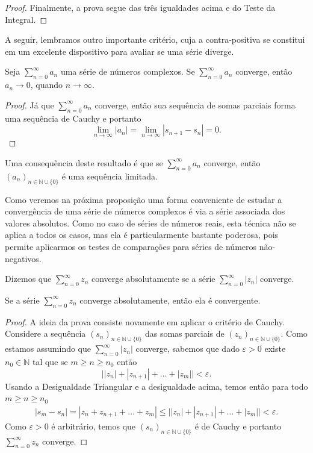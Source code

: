 \begin{proof}
Finalmente, a prova segue das três igualdades acima e do Teste da Integral.
\end{proof}


\bigskip 
A seguir, lembramos outro importante critério, cuja a contra-positiva se constitui 
em um excelente dispositivo para avaliar se uma série diverge.


\begin{proposicao}\label{prop-conv-term-geral-vai-zero}
Seja $\sum_{n=0}^{\infty} a_n$ uma série de números complexos. 
Se $\sum_{n=0}^{\infty}a_n$ converge, então $a_n\to 0$, quando $n\to\infty$.
\end{proposicao}

\begin{proof}
Já que $\sum_{n=0}^{\infty} a_n$ converge, então sua sequência de somas parciais
forma uma sequência de Cauchy e portanto 
\[
\lim_{n\to\infty} |a_n| = \lim_{n\to\infty} |s_{n+1}-s_n| = 0.
\]
\end{proof}

Uma consequência deste resultado é que se $\sum_{n=0}^{\infty}a_n$
converge, então $(a_n)_{n\in\mathbb{N}\cup\{0\}}$ é uma sequência limitada.

Como veremos na próxima proposição uma 
forma conveniente de estudar a convergência de uma série de números complexos é 
via a série associada dos valores absolutos. Como no caso de séries de números 
reais, esta técnica não se aplica a todos os casos, mas ela é particularmente 
bastante poderosa, pois permite aplicarmos os testes de comparações para 
séries de números não-negativos.


\begin{definicao}
\label{def-conv-absoluta}
Dizemos que $\sum_{n=0}^{\infty} z_n$ converge absolutamente se a série 
$\sum_{n=0}^{\infty}|z_n|$ converge. 
\end{definicao}

\begin{proposicao}\label{prop-conv-abs-implica-conv}
Se a série $\sum_{n=0}^{\infty} z_n$ converge absolutamente, então 
ela é convergente.
\end{proposicao}


\begin{proof}
A ideia da prova consiste novamente em aplicar o critério de Cauchy.
Considere a sequência $(s_n)_{n\in\mathbb{N}\cup\{0\}}$ 
das somas parciais de $(z_n)_{n\in\mathbb{N}\cup\{0\}}$.
Como estamos assumindo que $\sum_{n=0}^{\infty} |z_n|$ converge, 
sabemos que dado $\varepsilon>0$ existe $n_0\in\mathbb{N}$ tal que 
se $m \geqslant n\geqslant n_0$ então 
\[
\Big| |z_n|+|z_{n+1}| +\ldots +|z_m|  \Big|<\varepsilon.
\]
Usando a Desigualdade Triangular e a desigualdade acima, temos
então para todo $m\geqslant n \geqslant n_0$
\begin{align*}
|s_{m}-s_n| = |z_{n}+z_{n+1}+\ldots+ z_{m}|
\leqslant  
\Big| |z_n|+|z_{n+1}| +\ldots +|z_m|  \Big|<\varepsilon.
\end{align*}
Como $\varepsilon>0$ é arbitrário, 
temos que $(s_n)_{n\in\mathbb{N}\cup\{0\}}$ é de Cauchy e portanto 
$\sum_{n=0}^{\infty} z_n$ converge.
\end{proof}


